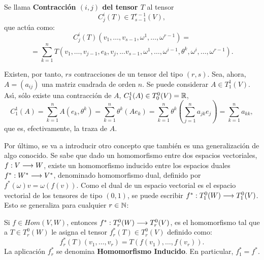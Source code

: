 \documentclass[cursovd_portada.tex]{subfiles}
\begin{document}
\begin{defiap}
Se llama {\bf Contracci\'{o}n $(i,j)$ del tensor $T$} al tensor
$$C^i_j(T)\in T^{r-1}_{s-1}(V),$$
que act\'{u}a como:
$$C^i_j(T)(v_1,\dots ,v_{s-1},\omega^1,\dots ,\omega^{r-1})=$$
$$=\sum_{k=1}^nT(v_1,\dots ,v_{j-1},e_k,v_j,...v_{s-1},\omega^1,\dots ,\omega^
{i-1},\theta^k,\omega^i,\dots ,\omega^{r-1}).$$
\end{defiap}
\par\bigskip
Existen, por tanto, $rs$ contracciones de un tensor del tipo $(r,s)$. Sea, ahora, $A=(a_{ij})$ una matriz cuadrada
de orden $n$. Se puede considerar $A \in T^1_1(V)$. As\'{\i}, s\'{o}lo existe una contracci\'{o}n de $A$, $C^1_1(A)\in T^0_0(V)
=\mathbb{R}$,
$$C^1_1(A)=\sum_{k=1}^nA(e_k,\theta^k)=\sum_{k=1}^n\theta ^k(Ae_k)=
\sum_{k=1}^n\theta^k(\sum_{j=1}^na_{jk}e_j)=\sum_{k=1}^na_{kk},$$ que es, efectivamente, la traza de $A$.
\par
Por \'{u}ltimo, se va a introducir otro concepto que tambi\'{e}n es una ge\-ne\-ra\-li\-za\-ci\'{o}n de algo conocido. Se sabe
que dado un homomorfismo entre dos espacios vectoriales, $f:V\longrightarrow W$, existe un homomorfismo inducido entre los
espacios duales $f^*:W^*\longrightarrow V^*$, denominado homomorfismo dual, definido por $f^*( \omega)v=\omega(f(v))$. Como el
dual de un espacio vectorial es el espacio vectorial de los tensores de tipo $(0,1)$, se puede escribir
$f^*:T^0_1(W)\longrightarrow T^0_1(V)$. Esto se generaliza para cualquier $r\in\mathbb{N}$:
\begin{defiap}
Si $f\in Hom(V,W)$, entonces $f^*:T^0_r(W)\longrightarrow T^0_r(V)$, es el homomorfismo tal que a $T\in T^0_r(W)$ le asigna el
tensor $f^*_r(T)\in T^0_r(V)$ definido como:
$$f^*_r(T)(v_1,\dots ,v_r)=T(f(v_1),\dots ,f(v_r)).$$
\hs La aplicaci\'{o}n $f^*_r$ se denomina {\bf Homomorfismo Inducido}. En particular, $f^*_1=f^*$.
\end{defiap}
\end{document}

